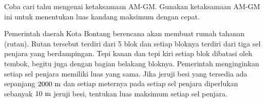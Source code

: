 	\begin{explbox}
		Coba cari tahu mengenai ketaksamaan AM-GM. Gunakan ketaksamaan AM-GM ini untuk menentukan luas kandang maksimum dengan cepat.
	\end{explbox}
	
	\begin{contoh}
		Pemerintah daerah Kota Bontang berencana akan membuat rumah tahanan (rutan). Rutan tersebut terdiri dari 5 blok dan setiap bloknya terdiri dari tiga sel penjara yang berdampingan. Tepi kanan dan tepi kiri setiap blok dibatasi oleh tembok, begitu juga dengan bagian belakang bloknya. Pemerintah menginginkan setiap sel penjara memiliki luas yang sama. Jika jeruji besi yang tersedia ada sepanjang $ 2000 \mathop{}\!\, \mathrm{{m}} $ dan setiap meternya pada setiap sel penjara diperlukan sebanyak $ 10 \mathop{}\!\, \mathrm{{m}} $ jeruji besi, tentukan luas maksimum setiap sel penjara.
	\end{contoh}
